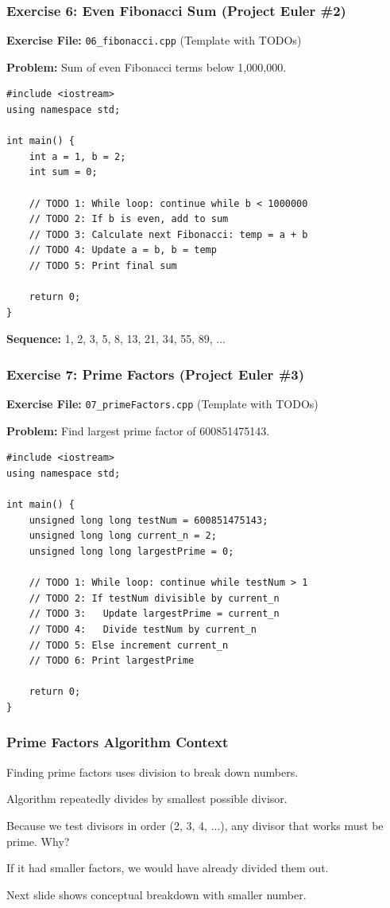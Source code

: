 \documentclass{beamer}
\begin{document}
\begin{frame}[fragile]
\frametitle{Exercise 6: Even Fibonacci Sum (Project Euler \#2)}
\textbf{Exercise File:} \texttt{06\_fibonacci.cpp} (Template with TODOs)

\textbf{Problem:} Sum of even Fibonacci terms below 1,000,000.\pause

\begin{verbatim}
#include <iostream>
using namespace std;

int main() {
    int a = 1, b = 2;
    int sum = 0;
    
    // TODO 1: While loop: continue while b < 1000000
    // TODO 2: If b is even, add to sum
    // TODO 3: Calculate next Fibonacci: temp = a + b
    // TODO 4: Update a = b, b = temp
    // TODO 5: Print final sum
    
    return 0;
}
\end{verbatim}

\textbf{Sequence:} 1, 2, 3, 5, 8, 13, 21, 34, 55, 89, ...
\end{frame}

\begin{frame}[fragile]
\frametitle{Exercise 7: Prime Factors (Project Euler \#3)}
\textbf{Exercise File:} \texttt{07\_primeFactors.cpp} (Template with TODOs)

\textbf{Problem:} Find largest prime factor of 600851475143.\pause

\begin{verbatim}
#include <iostream>
using namespace std;

int main() {
    unsigned long long testNum = 600851475143;
    unsigned long long current_n = 2;
    unsigned long long largestPrime = 0;
    
    // TODO 1: While loop: continue while testNum > 1
    // TODO 2: If testNum divisible by current_n
    // TODO 3:   Update largestPrime = current_n
    // TODO 4:   Divide testNum by current_n
    // TODO 5: Else increment current_n
    // TODO 6: Print largestPrime
    
    return 0;
}
\end{verbatim}
\end{frame}

\begin{frame}
\frametitle{Prime Factors Algorithm Context}
Finding prime factors uses division to break down numbers.\pause

Algorithm repeatedly divides by smallest possible divisor.\pause

Because we test divisors in order (2, 3, 4, ...), any divisor that works must be prime. Why?\pause

If it had smaller factors, we would have already divided them out.\pause

Next slide shows conceptual breakdown with smaller number.
\end{frame}
\end{document}
